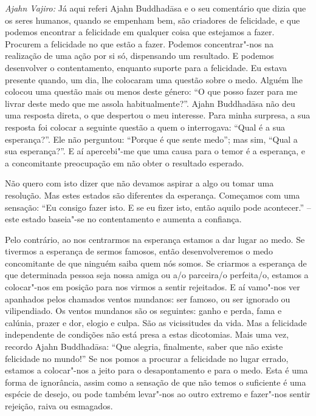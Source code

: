 \emph{Ajahn Vajiro:} Já aqui referi Ajahn Buddhadāsa e o seu comentário que
dizia que os seres humanos, quando se empenham bem, são criadores de felicidade,
e que podemos encontrar a felicidade em qualquer coisa que estejamos a fazer.
Procurem a felicidade no que estão a fazer. Podemos concentrar"-nos na realização
de uma ação por si só, dispensando um resultado. E podemos desenvolver o
contentamento, enquanto suporte para a felicidade. Eu estava presente quando, um
dia, lhe colocaram uma questão sobre o medo. Alguém lhe colocou uma questão mais
ou menos deste género: ``O que posso fazer para me livrar deste medo que me
assola habitualmente?''. Ajahn Buddhadāsa não deu uma resposta direta, o que
despertou o meu interesse. Para minha surpresa, a sua resposta foi colocar a
seguinte questão a quem o interrogava: ``Qual é a sua esperança?''. Ele não
perguntou: ``Porque é que sente medo''; mas sim, ``Qual a sua esperança?''. E aí
apercebi"-me que uma causa para o temor é a esperança, e a concomitante
preocupação em não obter o resultado esperado.

Não quero com isto dizer que não devamos aspirar a algo ou tomar uma resolução.
Mas estes estados são diferentes da esperança. Começamos com uma sensação: ``Eu
consigo fazer isto. E se eu fizer isto, então aquilo pode acontecer.'' -- este
estado baseia"-se no contentamento e aumenta a confiança.

Pelo contrário, ao nos centrarmos na esperança estamos a dar lugar ao medo. Se
tivermos a esperança de sermos famosos, então desenvolveremos o medo
concomitante de que ninguém saiba quem nós somos. Se criarmos a esperança de que
\mbox{determinada} pessoa seja nossa amiga ou a/o parceira/o perfeita/o, estamos a
colocar"-nos em posição para nos virmos a sentir rejeitados. E aí vamo"-nos ver
apanhados pelos chamados ventos mundanos: ser famoso, ou ser ignorado ou
vilipendiado. Os ventos mundanos são os seguintes: ganho e perda, fama e
calúnia, prazer e dor, elogio e culpa. São as vicissitudes da vida. Mas a
felicidade independente de condições não está presa a estas dicotomias. Mais uma
vez, recordo Ajahn Buddhadāsa: ``Que alegria, finalmente, saber que não existe
felicidade no mundo!'' Se nos pomos a procurar a felicidade no lugar errado,
estamos a colocar"-nos a jeito para o desapontamento e para o medo. Esta é uma
forma de ignorância, assim como a sensação de que não temos o suficiente é uma
espécie de desejo, ou pode também levar"-nos ao outro extremo e fazer"-nos sentir
rejeição, raiva ou esmagados.

\bigskip

